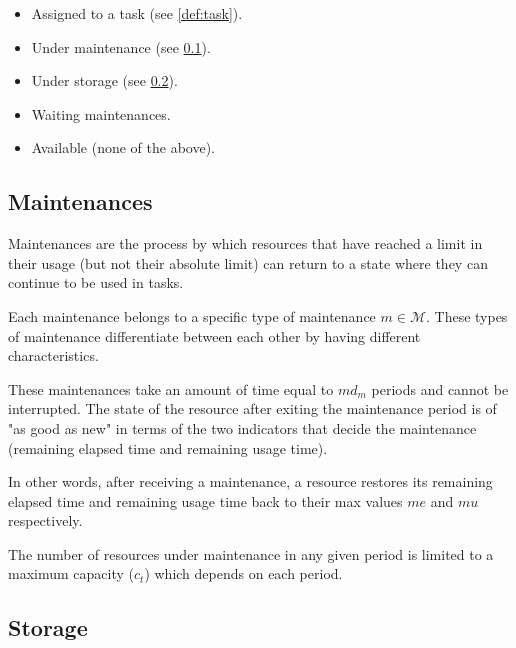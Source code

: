 \documentclass{roadef}
\begin{document}
    \begin{itemize}
        \item Assigned to a task (see \ref{def:task}).
        \item Under maintenance (see \ref{def:maint}).
        \item Under storage (see \ref{def:sto}).
        \item Waiting maintenances.
        \item Available (none of the above).
    \end{itemize}

    \subsection{Maintenances}
    \label{def:maint}

    Maintenances are the process by which resources that have reached a limit in their usage (but not their absolute limit) can return to a state where they can continue to be used in tasks.

    Each maintenance belongs to a specific type of maintenance $m \in \mathcal{M}$. These types of maintenance differentiate between each other by having different characteristics.

    These maintenances take an amount of time equal to $md_m$ periods and cannot be interrupted. The state of the resource after exiting the maintenance period is of "as good as new" in terms of the two indicators that decide the maintenance (remaining elapsed time and remaining usage time).
    
    In other words, after receiving a maintenance, a resource restores its remaining elapsed time and remaining usage time back to their max values $me$ and $mu$ respectively.

    The number of resources under maintenance in any given period is limited to a maximum capacity ($c_t$) which depends on each period.


    \subsection{Storage}
    \label{def:sto}
\end{document}
